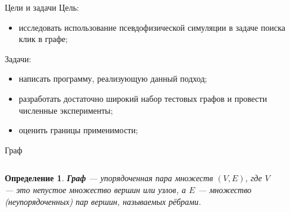 \documentclass{beamer}
\theoremstyle{plain}
\newtheorem{defi}{Определение}
\begin{document}


\begin{frame}{Цели и задачи}
  Цель:
  \begin{itemize}
    \item
    исследовать использование псевдофизической симуляции в задаче поиска клик в графе;
  \end{itemize}

  Задачи:
  \begin{itemize}
    \item
    написать программу, реализующую данный подход;

    \item
    разработать достаточно широкий набор тестовых графов и провести численные эксперименты;

    \item
    оценить границы применимости;
  \end{itemize}
\end{frame}

\begin{frame} {Граф}
  \begin{columns}[T] %
    \begin{column}[T]{5cm} %
      \begin{defi}
        \textbf{Граф} --- упорядоченная пара множеств $\left(V, E\right)$, где $V$ --- это непустое множество
        вершин или узлов, а $E$ --- множество (неупорядоченных) пар вершин, называемых
        рёбрами.
      \end{defi}
    \end{column}
    \begin{column}[T]{5cm} %
      \begin{figure}
        \centering
        \def\svgwidth{\columnwidth}
        
      \end{figure}
    \end{column}
  \end{columns}
\end{frame}
\end{document}

